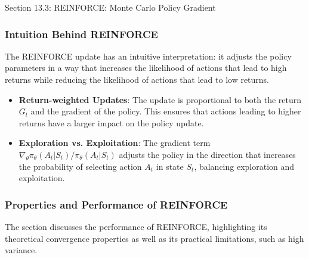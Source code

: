 \begin{notes}{Section 13.3: REINFORCE: Monte Carlo Policy Gradient}
\begin{highlight}
    \end{highlight}
    
    \subsubsection*{Intuition Behind REINFORCE}
    
    The REINFORCE update has an intuitive interpretation: it adjusts the policy parameters in a way that increases the likelihood of actions that lead to high returns while reducing the likelihood of 
    actions that lead to low returns.
    
    \begin{highlight}
    
        \begin{itemize}
            \item \textbf{Return-weighted Updates}: The update is proportional to both the return $G_t$ and the gradient of the policy. This ensures that actions leading to higher returns have a larger 
            impact on the policy update.
            \item \textbf{Exploration vs. Exploitation}: The gradient term $\nabla_\theta \pi_\theta(A_t|S_t) / \pi_\theta(A_t|S_t)$ adjusts the policy in the direction that increases the probability of 
            selecting action $A_t$ in state $S_t$, balancing exploration and exploitation.
        \end{itemize}
    
    \end{highlight}
    
    \subsubsection*{Properties and Performance of REINFORCE}
    
    The section discusses the performance of REINFORCE, highlighting its theoretical convergence properties as well as its practical limitations, such as high variance.
    
    \begin{highlight}
    

\end{highlight}
\end{notes}
